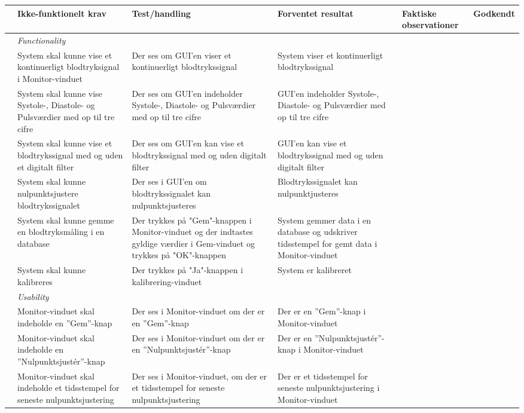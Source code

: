 \begin{longtabu} to 
	& Ikke-funktionelt krav & Test/handling & Forventet resultat & Faktiske observationer & Godkendt
	\\[-1ex] \midrule
	&  \textit{Functionality} &  &  & & \\ \midrule
	& System skal kunne vise et kontinuerligt blodtryksignal i Monitor-vinduet & Der ses om GUI'en viser et kontinuerligt blodtrykssignal & System viser et kontinuerligt blodtrykssignal &  & %
	\\ \midrule
	& System skal kunne vise Systole-, Diastole- og Pulsværdier med op til tre cifre & Der ses om GUI'en indeholder Systole-, Diastole- og Pulsværdier med op til tre cifre & GUI'en indeholder Systole-, Diastole- og Pulsværdier med op til tre cifre &  & %
	\\ \midrule
	& System skal kunne vise et blodtrykssignal med og uden et digitalt filter & Der ses om GUI'en kan vise et blodtrykssignal med og uden digitalt filter & GUI'en kan vise et blodtrykssignal med og uden digitalt filter &  & %
	\\ \midrule
	& System skal kunne nulpunktsjustere blodtrykssignalet & Der ses i GUI'en om blodtrykssignalet kan nulpunktsjusteres & Blodtrykssignalet kan nulpunktjusteres &  & %
	\\ \midrule
	& System skal kunne gemme en blodtryksmåling i en database & Der trykkes på "Gem"\--knappen i Monitor-vinduet og der indtastes gyldige værdier i Gem-vinduet og trykkes på "OK"\--knappen & System gemmer data i en database og udskriver tidsstempel for gemt data i Monitor-vinduet &  & %
	\\ \midrule
	& System skal kunne kalibreres & Der trykkes på "Ja"\--knappen i kalibrering-vinduet & System er kalibreret &  & %
	\\ \midrule
	& \textit{Usability} &  &  & & \\ \midrule
	& Monitor-vinduet skal indeholde en ”Gem”\--knap & Der ses i Monitor-vinduet om der er en ”Gem”\--knap & Der er en ”Gem”\--knap i Monitor-vinduet &  & %
	\\ \midrule
	& Monitor-vinduet skal indeholde en ”Nulpunktsjustér”\--knap & Der ses i Monitor-vinduet om der er en ”Nulpunktsjustér”\--knap & Der er en ”Nulpunktsjustér”\--knap i Monitor-vinduet &  & %
	\\ \midrule 
	& Monitor-vinduet skal indeholde et tidsstempel for seneste nulpunktsjustering & Der ses i Monitor-vinduet, om der er et tidsstempel for seneste nulpunktsjustering & Der er et tidsstempel for seneste nulpunktsjustering i Monitor-vinduet & & %

\end{longtabu}
